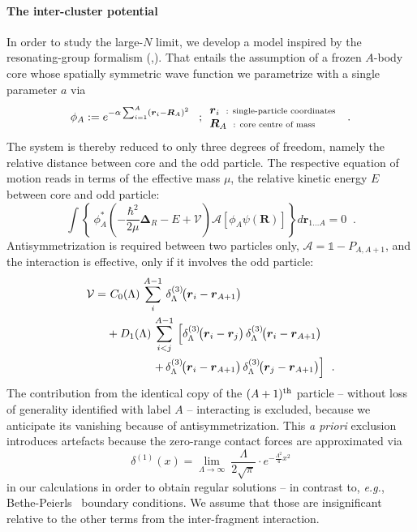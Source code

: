 \documentclass[onecolumn,preprint,superscriptaddress,nofootinbib,notitlepage,10pt,linenumbers]{revtex4-1}
\newcommand{\la}{\label}
\newcommand{\be}{\begin{equation}}
\newcommand{\ee}{\end{equation}}
\newcommand{\eg}{\textit{e.g.}\;}
\newcommand{\ve}[1]{\ensuremath{\boldsymbol{#1}}}
\newcommand{\ddrei}[1]{\delta_{\tiny \Lambda}^{(3)}\!\big(#1\big)}
\newcommand{\cc}{\ensuremath C_0(\Lambda)}
\newcommand{\dd}{\ensuremath D_1(\Lambda)}
\begin{document}
\paragraph{The inter-cluster potential}
In order to study the large-$N$ limit, we develop a model inspired by the resonating-group formalism
(\cite{Wheeler:1937zz},\cite{Wildermuth1977}).
That entails the assumption of a frozen $A$-body core whose spatially symmetric wave function we
parametrize with a single parameter $a$ via
\be\label{eq.rgm.corewfkt}
\phi_A:=e^{-\alpha\sum_{i=1}^A\left(\ve{r}_i-\ve{R}_A\right)^2}\;\;\;;
\begin{array}{l}
     \ve{r}_i\;\;\text{\scriptsize : single-particle coordinates}  \\
     \ve{R}_A\;\;\text{\scriptsize : core centre of mass}
\end{array}\;\;.
\ee
The system is thereby reduced to only three degrees of freedom, namely the relative distance
between core and the odd particle. The respective equation of motion reads in terms of the effective
mass $\mu$, the relative kinetic energy $E$ between core and odd particle:
\be\label{eq.rgm.eqom}
\int\left\lbrace~\phi^*_A\left(-\frac{\hbar^2}{2\mu}\ve{\Delta}_R-E+\mathcal{V}\right)
\mathcal{A}\left[\phi_A\psi(\ve{R})\right]\right\rbrace d\ve{r}_{1\ldots A}=0\;\;.
\ee
Antisymmetrization is required between two particles only, 
$\mathcal{A}=\mathbb{1}-P_{A,A+1}$, 
and the interaction is effective, only if it involves the odd particle:
\begin{align}
\mathcal{V}=&~\cc\,\sum_{i}^{A-1}\,\ddrei{\ve{r}_i-\ve{r}_{A+1}}\\
&+\dd\,\sum^{A-1}_{i<j}\,\left[\ddrei{\ve{r}_i-\ve{r}_j}\,
\ddrei{\ve{r}_i-\ve{r}_{A+1}}\right.\\&\qquad\qquad\left.+
\,\ddrei{\ve{r}_i-\ve{r}_{A+1}}\,
\ddrei{\ve{r}_j-\ve{r}_{A+1}}\right]\;\,.
\end{align}
The contribution from the identical copy of the $(A+1)^\text{\scriptsize th}$ particle
-- without loss of generality identified with label $A$ -- interacting is excluded, 
because we anticipate its vanishing because of antisymmetrization. This {\it a priori} exclusion introduces artefacts
because the zero-range contact forces are approximated via
\be\la{eq.delta}
\delta^{(1)}(x)=\lim_{\Lambda\to\infty}~\frac{\Lambda}{2\sqrt{\pi}}\cdot e^{-\frac{\Lambda^2}{4}x^2}
\ee
in our calculations in order to obtain regular solutions -- in contrast to, \eg,
Bethe-Peierls~\cite{bethePeierls} boundary conditions.
We assume that those are insignificant relative to the other terms from 
the inter-fragment interaction.
\end{document}

